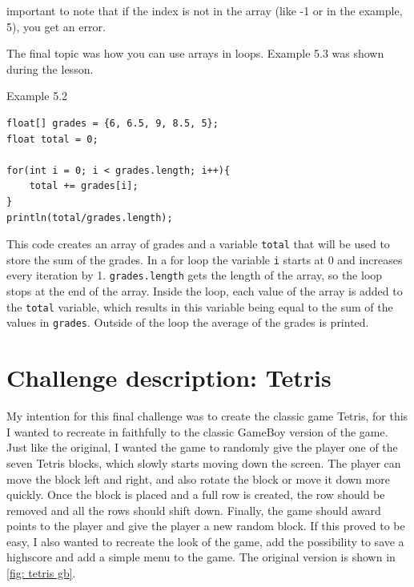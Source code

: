important to note that if the index is not in the array (like -1 or in the example, 5), you get an error.

\newpage

The final topic was how you can use arrays in loops. Example 5.3 was shown during the lesson.

\begin{codebox}{Example 5.2}
    \begin{lstlisting}
float[] grades = {6, 6.5, 9, 8.5, 5};
float total = 0;

for(int i = 0; i < grades.length; i++){
    total += grades[i];
} 
println(total/grades.length);
    \end{lstlisting}
\end{codebox}

This code creates an array of grades and a variable \texttt{total} that will be used to store the sum of the grades. In a for loop the variable \texttt{i} starts at 0 and increases every iteration by 1. \texttt{grades.length} gets the length of the array, so the loop stops at the end of the array. Inside the loop, each value of the array is added to the \texttt{total} variable, which results in this variable being equal to the sum of the values in \texttt{grades}. Outside of the loop the average of the grades is printed.

\section{Challenge description: Tetris}

My intention for this final challenge was to create the classic game Tetris, for this I wanted to recreate in faithfully to the classic GameBoy version of the game. Just like the original, I wanted the game to randomly give the player one of the seven Tetris blocks, which slowly starts moving down the screen. The player can move the block left and right, and also rotate the block or move it down more quickly. Once the block is placed and a full row is created, the row should be removed and all the rows should shift down. Finally, the game should award points to the player and give the player a new random block. If this proved to be easy, I also wanted to recreate the look of the game, add the possibility to save a highscore and add a simple menu to the game. The original version is shown in \cref{fig: tetris gb}.


